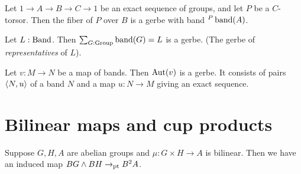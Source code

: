 \begin{definition}
  Let $1\to A\to B\to C\to 1$ be an exact sequence of groups, and let
  $P$ be a $C$-torsor. Then the fiber of $P$ over $B$ is a gerbe with
  band ${}^P\operatorname{band}(A)$.
\end{definition}

\begin{definition}
  Let $L : \mathord{\mathrm{Band}}$. Then $\sum_{G:\mathord{\mathrm{Group}}}\operatorname{band}(G)=L$ is a gerbe. (The
  gerbe of \emph{representatives} of $L$).
\end{definition}

\begin{definition} %
  Let $v : M \to N$ be a map of bands. Then $\operatorname{Aut}(v)$ is a gerbe. It
  consists of pairs $\langle N,u\rangle$ of a band $N$ and a map $u:N\to M$
  giving an exact sequence.
\end{definition}

\section{Bilinear maps and cup products}

Suppose $G,H,A$ are abelian groups and $\mu : G \times H \to A$ is
bilinear. Then we have an induced map $BG \wedge BH \to_{\mathord{\mathrm{pt}}} B^2A$.

